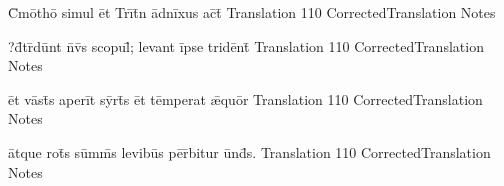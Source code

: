 \documentclass[]{book}
\begin{document}
\latline
  {C\={}m\=otho\={} s\-im\-ul \=et Tr\={\i}t\={}n \=adn\=ix\-us \-ac\={}t\={}}
  { Translation }
  {110}
  { CorrectedTranslation }
  { Notes }



\newpage

\latline
  {?d\={}tr\={}d\=unt n\={}v\={\macron {\i}}s sc\-op\-ul\={}; l\-ev\-ant \=ips\-e tr\-id\=ent\={\macron {\i}}}
  { Translation }
  {110}
  { CorrectedTranslation }
  { Notes }


\latline
  {\=et v\=ast\={}s \-ap\-er\=it s\=yrt\={\macron {\i}}s \=et t\=emp\-er\-at \={\ae}qu\=or}
  { Translation }
  {110}
  { CorrectedTranslation }
  { Notes }


\latline
  {\=atqu\-e r\-ot\={\macron {\i}}s s\=umm\={}s l\-ev\-ib\=us p\=er\={}b\-it\-ur \=und\={}s.}
  { Translation }
  {110}
  { CorrectedTranslation }
  { Notes }



\newpage
\end{document}
